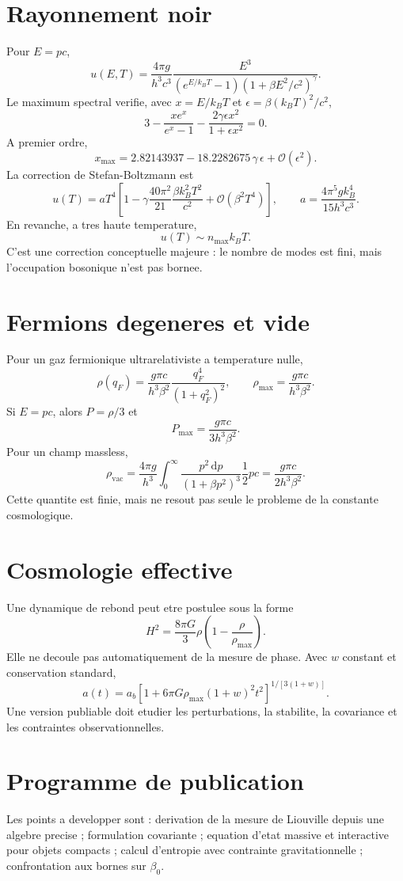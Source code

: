 \documentclass[11pt,a4paper]{article}
\newcommand{\dd}{\mathrm{d}}
\newcommand{\Ocal}{\mathcal{O}}
\begin{document}
\section{Rayonnement noir}
Pour $E=pc$,
\[
u(E,T)=\frac{4\pi g}{h^3c^3}\frac{E^3}{(e^{E/k_BT}-1)(1+\beta E^2/c^2)^\gamma}.
\]
Le maximum spectral verifie, avec $x=E/k_BT$ et $\epsilon=\beta(k_BT)^2/c^2$,
\[
3-\frac{x e^x}{e^x-1}-\frac{2\gamma\epsilon x^2}{1+\epsilon x^2}=0.
\]
A premier ordre,
\[
x_{\max}=2.82143937-18.2282675\,\gamma\,\epsilon+\Ocal(\epsilon^2).
\]
La correction de Stefan-Boltzmann est
\[
u(T)=aT^4\left[1-\gamma\frac{40\pi^2}{21}\frac{\beta k_B^2T^2}{c^2}+\Ocal(\beta^2T^4)\right],\qquad
 a=\frac{4\pi^5gk_B^4}{15h^3c^3}.
\]
En revanche, a tres haute temperature,
\[
u(T)\sim n_{\max}k_BT.
\]
C'est une correction conceptuelle majeure : le nombre de modes est fini, mais l'occupation bosonique n'est pas bornee.

\section{Fermions degeneres et vide}
Pour un gaz fermionique ultrarelativiste a temperature nulle,
\[
\rho(q_F)=\frac{g\pi c}{h^3\beta^2}\frac{q_F^4}{(1+q_F^2)^2},\qquad
\rho_{\max}=\frac{g\pi c}{h^3\beta^2}.
\]
Si $E=pc$, alors $P=\rho/3$ et
\[
P_{\max}=\frac{g\pi c}{3h^3\beta^2}.
\]
Pour un champ massless,
\[
\rho_{\mathrm{vac}}=\frac{4\pi g}{h^3}\int_0^\infty \frac{p^2\,\dd p}{(1+\beta p^2)^3}\frac12 pc
=\frac{g\pi c}{2h^3\beta^2}.
\]
Cette quantite est finie, mais ne resout pas seule le probleme de la constante cosmologique.

\section{Cosmologie effective}
Une dynamique de rebond peut etre postulee sous la forme
\[
H^2=\frac{8\pi G}{3}\rho\left(1-\frac{\rho}{\rho_{\max}}\right).
\]
Elle ne decoule pas automatiquement de la mesure de phase. Avec $w$ constant et conservation standard,
\[
a(t)=a_b\left[1+6\pi G\rho_{\max}(1+w)^2t^2\right]^{1/[3(1+w)]}.
\]
Une version publiable doit etudier les perturbations, la stabilite, la covariance et les contraintes observationnelles.

\section{Programme de publication}
Les points a developper sont : derivation de la mesure de Liouville depuis une algebre precise ; formulation covariante ; equation d'etat massive et interactive pour objets compacts ; calcul d'entropie avec contrainte gravitationnelle ; confrontation aux bornes sur $\beta_0$.
\end{document}
